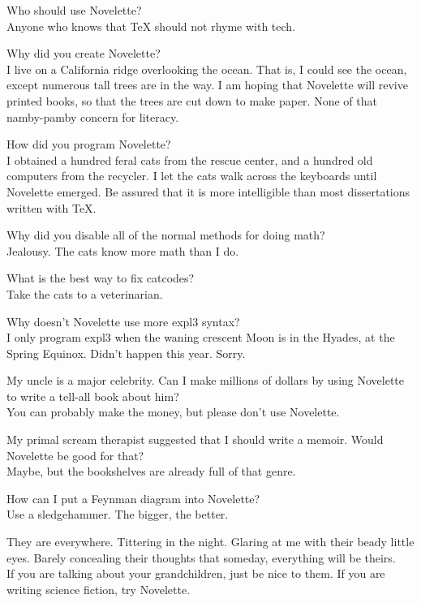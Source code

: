 \documentclass{novelette} %
\begin{document}
\begingroup\setlength\parindent{0pt}
 Who should use Novelette?\\
 Anyone who knows that TeX should not rhyme with tech.\par
{} Why did you create Novelette?\\
 I live on a California ridge overlooking the ocean. That is,
I could see the ocean, except numerous tall trees are in the way. I am hoping
that Novelette will revive printed books, so that the trees are cut down
to make paper. None of that namby-pamby concern for literacy.\par
{} How did you program Novelette?\\
 I obtained a hundred feral cats from the rescue center, and a
hundred old computers from the recycler. I let the cats walk across the
keyboards until Novelette emerged. Be assured that it is more intelligible
than most dissertations written with TeX.\par
{} Why did you disable all of the normal methods for doing math?\\
 Jealousy. The cats know more math than I do.\par
{} What is the best way to fix catcodes?\\
 Take the cats to a veterinarian.\par
{} Why doesn't Novelette use more expl3 syntax?\\
 I only program expl3 when the waning crescent Moon is in the Hyades,
at the Spring Equinox. Didn't happen this year. Sorry.\par
{} My uncle is a major celebrity. Can I make millions of dollars
by using Novelette to write a tell-all book about him?\\
 You can probably make the money, but please don't use Novelette.\par
{} My primal scream therapist suggested that I should write a memoir.
Would Novelette be good for that?\\
 Maybe, but the bookshelves are already full of that genre.\par
{} How can I put a Feynman diagram into Novelette?\\
 Use a sledgehammer. The bigger, the better.\par
{} They are everywhere. Tittering in the night. Glaring at me with
their beady little eyes. Barely concealing their thoughts that someday,
everything will be theirs. \\
 If you are talking about your grandchildren, just be nice to them.
If you are writing science fiction, try Novelette.\par
\endgroup

\makeatletter\nocle@rtoendtrue\makeatother
\end{document}
